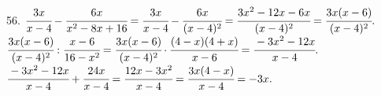 56. $\cfrac{3x}{x-4}-\cfrac{6x}{x^2-8x+16}=\cfrac{3x}{x-4}-\cfrac{6x}{(x-4)^2}=\cfrac{3x^2-12x-6x}{(x-4)^2}=\cfrac{3x(x-6)}{(x-4)^2}.$\\
$\cfrac{3x(x-6)}{(x-4)^2}:\cfrac{x-6}{16-x^2}=\cfrac{3x(x-6)}{(x-4)^2}\cdot\cfrac{(4-x)(4+x)}{x-6}=\cfrac{-3x^2-12x}{x-4}.$\\
$\cfrac{-3x^2-12x}{x-4}+\cfrac{24x}{x-4}=\cfrac{12x-3x^2}{x-4}=\cfrac{3x(4-x)}{x-4}=-3x.$\\
